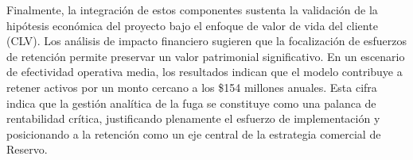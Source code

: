 Finalmente, la integración de estos componentes sustenta la validación de la hipótesis económica del proyecto bajo el enfoque de valor de vida del cliente (CLV). Los análisis de impacto financiero sugieren que la focalización de esfuerzos de retención permite preservar un valor patrimonial significativo. En un escenario de efectividad operativa media, los resultados indican que el modelo contribuye a retener activos por un monto cercano a los \$154 millones anuales. Esta cifra indica que la gestión analítica de la fuga se constituye como una palanca de rentabilidad crítica, justificando plenamente el esfuerzo de implementación y posicionando a la retención como un eje central de la estrategia comercial de Reservo.

\newpage


\clearpage




\newpage

